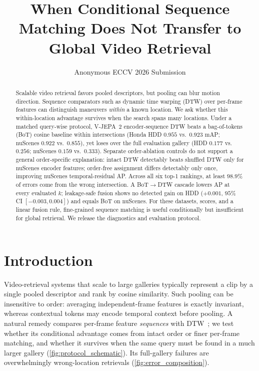 \documentclass[runningheads]{llncs}
\title{When Conditional Sequence Matching Does Not Transfer to Global Video Retrieval}
\author{Anonymous ECCV 2026 Submission}
\institute{Paper ID 12}
\begin{document}
\maketitle

\begin{abstract}
Scalable video retrieval favors pooled descriptors, but pooling can blur motion direction.
Sequence comparators such as dynamic time warping (DTW) over per-frame features can distinguish
maneuvers \emph{within} a known location. We ask whether this within-location advantage survives
when the search spans many locations. Under a matched query-wise protocol, V-JEPA~2
encoder-sequence DTW beats a bag-of-tokens (BoT) cosine baseline within intersections (Honda HDD
$0.955$ vs.\ $0.923$ mAP; nuScenes $0.922$ vs.\ $0.855$), yet loses over the full evaluation
gallery (HDD $0.177$ vs.\ $0.256$; nuScenes $0.159$ vs.\ $0.333$). Separate order-ablation
controls do not support a general order-specific explanation: intact DTW detectably beats
shuffled DTW only for nuScenes encoder features; order-free assignment differs detectably only
once, improving nuScenes temporal-residual AP.
Across all six top-1 rankings, at least $98.9\%$ of errors come from the wrong intersection.
A BoT$\to$DTW cascade lowers AP at
every evaluated $k$; leakage-safe fusion shows no detected gain on HDD ($+0.001$, $95\%$ CI
$[-0.003, 0.004]$) and equals BoT on nuScenes. For these datasets, scores, and a linear fusion rule,
fine-grained sequence matching is useful conditionally but insufficient for global retrieval. We
release the diagnostics and evaluation protocol.
\end{abstract}

\section{Introduction}
\label{sec:intro}
Video-retrieval systems that scale to large galleries typically represent a clip by a single pooled
descriptor and rank by cosine similarity. Such pooling can be insensitive to order: averaging
independent-frame features is exactly invariant, whereas contextual tokens may encode temporal
context before pooling. A natural remedy compares
per-frame feature \emph{sequences} with DTW~\cite{sakoe1978dtw}; we test whether its conditional
advantage comes from intact order or finer per-frame matching, and whether it survives when the
same query must be found in a much larger gallery (\cref{fig:protocol_schematic}). Its
full-gallery failures are overwhelmingly wrong-location retrievals (\cref{fig:error_composition}).
\end{document}
